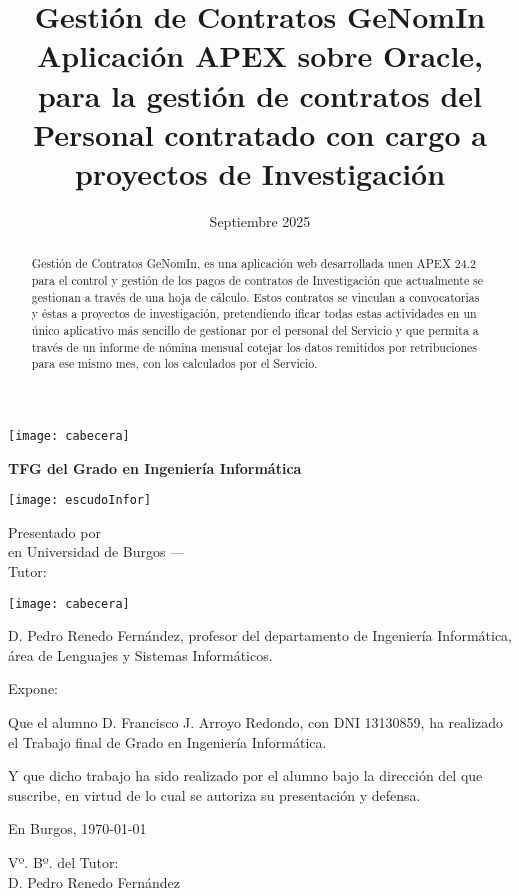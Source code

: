 \documentclass[a4paper,12pt,twoside]{memoir}
\title{\fontsize{18pt}{22pt}\selectfont Gestión de Contratos GeNomIn\\
	\fontsize{16pt}{18pt}\selectfont Aplicación APEX sobre Oracle, para la gestión de contratos del Personal contratado con cargo a proyectos de Investigación}
\author{\nombre}
\date{Septiembre 2025}
\makeatletter
\def\maketitle{
  \null
  \thispagestyle{empty}
\noindent\texttt{[image: cabecera]}\vspace{1cm}%
  \vfill
  
  \colorbox{cpardoBox}{%
    \begin{minipage}{.8\textwidth}
      \vspace{.5cm}\Large
      \begin{center}
      \textbf{TFG del Grado en Ingeniería Informática}\vspace{.6cm}\\
      \textbf{\LARGE\@title{}}
      \end{center}
      \vspace{.2cm}
    \end{minipage}

  }%
  \hfill\begin{minipage}{.20\textwidth}
    \texttt{[image: escudoInfor]}
  \end{minipage}
  \vfill
  
  \begin{center}%
  {%
    \noindent\LARGE
    Presentado por \@author{}\\ 
    en Universidad de Burgos --- \@date{}\\
    Tutor: \@tutor{}\\
  }%
  \end{center}%
  \null
  \cleardoublepage
  }
\newcommand{\nombre}{Francisco J. Arroyo Redondo}
\makeatother
\begin{document}
\maketitle




\thispagestyle{empty}


\noindent\texttt{[image: cabecera]}\vspace{1cm}

\noindent D. Pedro Renedo Fernández, profesor del departamento de Ingeniería Informática, área de Lenguajes y Sistemas Informáticos.

\noindent Expone:

\noindent Que el alumno D. \nombre, con DNI 13130859, ha realizado el Trabajo final de Grado en Ingeniería Informática. 

\noindent Y que dicho trabajo ha sido realizado por el alumno bajo la dirección del que suscribe, en virtud de lo cual se autoriza su presentación y defensa.

\begin{center} %
En Burgos, {\large \today}
\end{center}

\vfill\vfill\vfill

\begin{center}
  Vº. Bº. del Tutor:\\[2cm]
  D. Pedro Renedo Fernández
  \end{center}


\newpage\null\thispagestyle{empty}\newpage




\frontmatter

\renewcommand*\abstractname{Resumen}
\begin{abstract}
Gestión de Contratos GeNomIn, es una aplicación web desarrollada unen \acrfull{APEX} 24.2 para el control y gestión de los pagos de contratos de  Investigación que actualmente se gestionan a través de una hoja de cálculo. Estos contratos se vinculan a convocatorias y éstas a proyectos de investigación, pretendiendo ificar todas estas actividades en un único aplicativo más sencillo de gestionar por el personal del Servicio y que permita a través de un informe de nómina mensual cotejar los datos remitidos por retribuciones para ese mismo mes, con los calculados por el Servicio.

\end{abstract}
\end{document}
